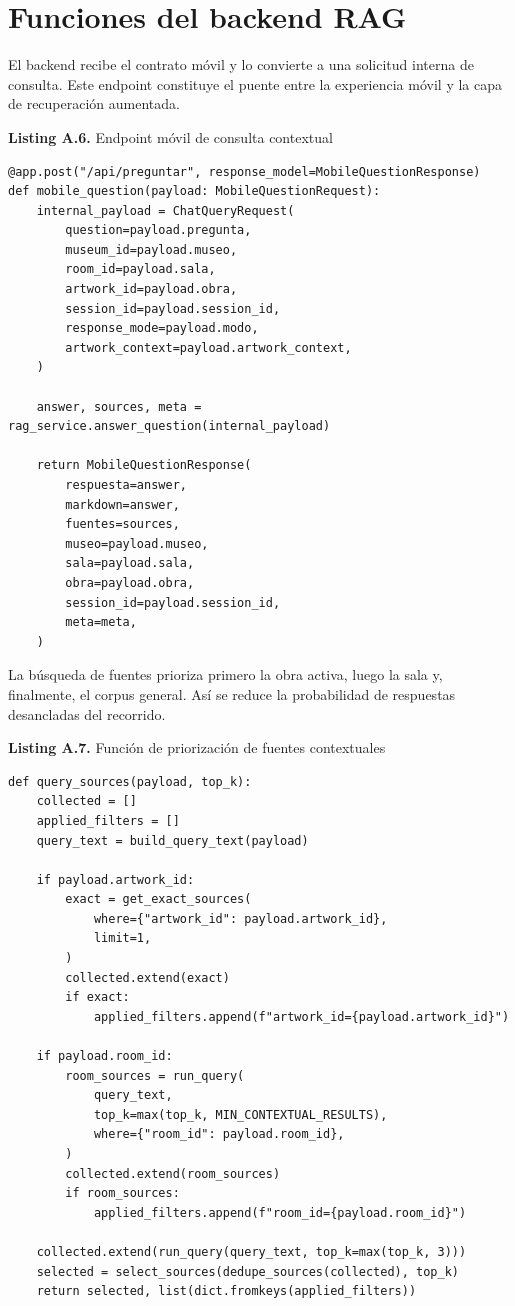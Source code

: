 \section{Funciones del backend RAG}

El backend recibe el contrato móvil y lo convierte a una solicitud interna de consulta. Este endpoint constituye el puente entre la experiencia móvil y la capa de recuperación aumentada.

\begin{center}
\textbf{Listing A.6.} Endpoint móvil de consulta contextual
\end{center}

\begin{lstlisting}[style=pythoncode]
@app.post("/api/preguntar", response_model=MobileQuestionResponse)
def mobile_question(payload: MobileQuestionRequest):
    internal_payload = ChatQueryRequest(
        question=payload.pregunta,
        museum_id=payload.museo,
        room_id=payload.sala,
        artwork_id=payload.obra,
        session_id=payload.session_id,
        response_mode=payload.modo,
        artwork_context=payload.artwork_context,
    )

    answer, sources, meta = rag_service.answer_question(internal_payload)

    return MobileQuestionResponse(
        respuesta=answer,
        markdown=answer,
        fuentes=sources,
        museo=payload.museo,
        sala=payload.sala,
        obra=payload.obra,
        session_id=payload.session_id,
        meta=meta,
    )
\end{lstlisting}

La búsqueda de fuentes prioriza primero la obra activa, luego la sala y, finalmente, el corpus general. Así se reduce la probabilidad de respuestas desancladas del recorrido.

\begin{center}
\textbf{Listing A.7.} Función de priorización de fuentes contextuales
\end{center}

\begin{lstlisting}[style=pythoncode]
def query_sources(payload, top_k):
    collected = []
    applied_filters = []
    query_text = build_query_text(payload)

    if payload.artwork_id:
        exact = get_exact_sources(
            where={"artwork_id": payload.artwork_id},
            limit=1,
        )
        collected.extend(exact)
        if exact:
            applied_filters.append(f"artwork_id={payload.artwork_id}")

    if payload.room_id:
        room_sources = run_query(
            query_text,
            top_k=max(top_k, MIN_CONTEXTUAL_RESULTS),
            where={"room_id": payload.room_id},
        )
        collected.extend(room_sources)
        if room_sources:
            applied_filters.append(f"room_id={payload.room_id}")

    collected.extend(run_query(query_text, top_k=max(top_k, 3)))
    selected = select_sources(dedupe_sources(collected), top_k)
    return selected, list(dict.fromkeys(applied_filters))
\end{lstlisting}

